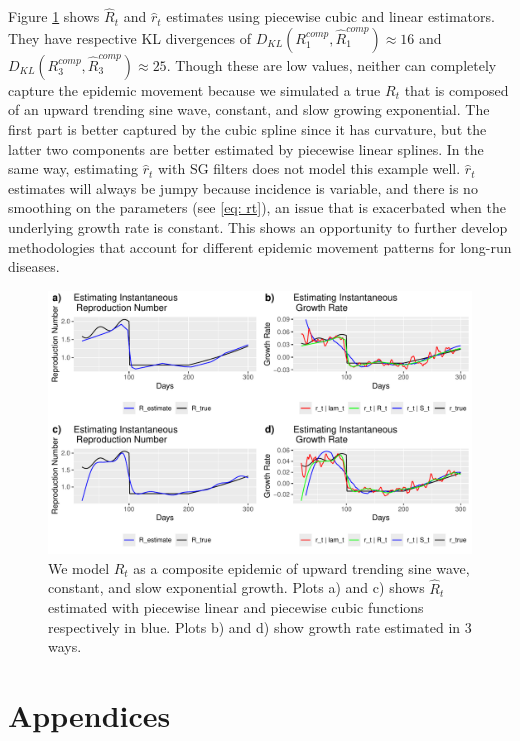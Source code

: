 \documentclass[12pt]{article}
\begin{document}
    Figure \cref{fig: comp} shows $\hat{R}_t$ and $\hat{r}_t$ estimates using piecewise cubic and linear estimators. They have respective KL divergences of $D_{KL}(R_1^{comp}, \hat{R}_1^{comp}) \approx 16$ and $D_{KL}(R_3^{comp}, \hat{R}_3^{comp}) \approx 25$. Though these are low values, neither can completely capture the epidemic movement because
    we simulated a true $R_t$ that is composed of an upward trending sine wave, constant, and slow growing exponential. The first part is better
    captured by the cubic spline since it has curvature, but the latter two components are better estimated by piecewise linear splines. In the same
    way, estimating $\hat{r}_t$ with SG filters does not model this example well. $\hat{r}_t$ estimates will always be jumpy because incidence is variable, 
    and there is no smoothing on the parameters (see \cref{eq: rt}), an issue that is exacerbated when the underlying growth rate is constant. This shows an opportunity to further develop methodologies that account for different epidemic movement patterns for long-run diseases.
    \begin{figure}[h]
      \centering
      \includegraphics[scale = 0.75]{epi_comp.pdf}
      \caption{We model $R_t$ as a composite epidemic of upward trending sine wave, constant, and slow exponential growth. Plots a) and c) shows $\hat{R}_t$ estimated with piecewise linear and piecewise cubic functions respectively in blue. Plots b) and d) show growth rate estimated in 3 ways.}
      \label{fig: comp}
    \end{figure}
        
  \newpage

  \section{Appendices}
\end{document}
